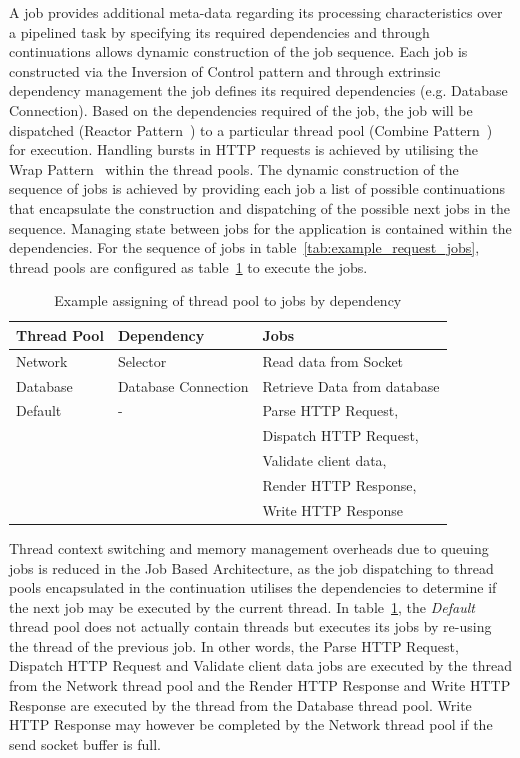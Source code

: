 \documentclass[conference]{ieee/IEEEtran}
\begin{document}
A job provides additional meta-data regarding its processing characteristics
over a pipelined task by specifying its required dependencies and through
continuations allows dynamic construction of the job sequence.  Each job is
constructed via the Inversion of Control pattern and through extrinsic
dependency management \cite{ioc} the job defines its required dependencies (e.g.
Database Connection).  Based on the dependencies required of the job, the job
will be dispatched (Reactor Pattern~\cite{reactor}) to a particular thread pool
(Combine Pattern~\cite{pipeline}) for execution. Handling bursts in HTTP
requests is achieved by utilising the Wrap Pattern~\cite{pipeline} within the
thread pools.  The dynamic construction of the sequence of jobs is achieved by
providing each job a list of possible continuations \cite{continuations} that
encapsulate the construction and dispatching of the possible next jobs in the
sequence. Managing state between jobs for the application is contained within
the dependencies.  For the sequence of jobs in
table~\ref{tab:example_request_jobs}, thread pools are configured as
table~\ref{tab:example_request_thread_pools} to execute the jobs.

\begin{table}[!t]
\renewcommand{\arraystretch}{1.3}
\caption{Example assigning of thread pool to jobs by dependency}
\label{tab:example_request_thread_pools}
\centering
\begin{tabular}{l||l||l}
\hline
\bfseries Thread Pool & \bfseries Dependency & \bfseries Jobs \\
\hline
\hline
Network & Selector & Read data from Socket \\
\hline
Database & Database Connection & Retrieve Data from database \\
\hline
Default & - & Parse HTTP Request, \\
& & Dispatch HTTP Request, \\
& & Validate client data, \\ 
& & Render HTTP Response, \\
& & Write HTTP Response \\
\hline
\end{tabular}
\end{table}

Thread context switching and memory management overheads due to queuing jobs is
reduced in the Job Based Architecture, as the job dispatching to thread pools
encapsulated in the continuation utilises the dependencies to determine if the
next job may be executed by the current thread.  In
table~\ref{tab:example_request_thread_pools}, the \textit{Default} thread pool
does not actually contain threads but executes its jobs by re-using the thread
of the previous job.  In other words, the Parse HTTP Request, Dispatch HTTP
Request and Validate client data jobs are executed by the thread from the
Network thread pool and the Render HTTP Response and Write HTTP Response are
executed by the thread from the Database thread pool.  Write HTTP Response may
however be completed by the Network thread pool if the send socket buffer is
full.
\end{document}
